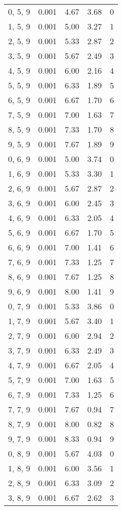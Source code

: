 \documentclass[12pt]{article}
\begin{document}
\begin{tabular}{c || c || c | c | c}
0, 5, 9 & 0.001 & 4.67 & 3.68 & 0 \\
1, 5, 9 & 0.001 & 5.00 & 3.27 & 1 \\
2, 5, 9 & 0.001 & 5.33 & 2.87 & 2 \\
3, 5, 9 & 0.001 & 5.67 & 2.49 & 3 \\
4, 5, 9 & 0.001 & 6.00 & 2.16 & 4 \\
5, 5, 9 & 0.001 & 6.33 & 1.89 & 5 \\
6, 5, 9 & 0.001 & 6.67 & 1.70 & 6 \\
7, 5, 9 & 0.001 & 7.00 & 1.63 & 7 \\
8, 5, 9 & 0.001 & 7.33 & 1.70 & 8 \\
9, 5, 9 & 0.001 & 7.67 & 1.89 & 9 \\
0, 6, 9 & 0.001 & 5.00 & 3.74 & 0 \\
1, 6, 9 & 0.001 & 5.33 & 3.30 & 1 \\
2, 6, 9 & 0.001 & 5.67 & 2.87 & 2 \\
3, 6, 9 & 0.001 & 6.00 & 2.45 & 3 \\
4, 6, 9 & 0.001 & 6.33 & 2.05 & 4 \\
5, 6, 9 & 0.001 & 6.67 & 1.70 & 5 \\
6, 6, 9 & 0.001 & 7.00 & 1.41 & 6 \\
7, 6, 9 & 0.001 & 7.33 & 1.25 & 7 \\
8, 6, 9 & 0.001 & 7.67 & 1.25 & 8 \\
9, 6, 9 & 0.001 & 8.00 & 1.41 & 9 \\
0, 7, 9 & 0.001 & 5.33 & 3.86 & 0 \\
1, 7, 9 & 0.001 & 5.67 & 3.40 & 1 \\
2, 7, 9 & 0.001 & 6.00 & 2.94 & 2 \\
3, 7, 9 & 0.001 & 6.33 & 2.49 & 3 \\
4, 7, 9 & 0.001 & 6.67 & 2.05 & 4 \\
5, 7, 9 & 0.001 & 7.00 & 1.63 & 5 \\
6, 7, 9 & 0.001 & 7.33 & 1.25 & 6 \\
7, 7, 9 & 0.001 & 7.67 & 0.94 & 7 \\
8, 7, 9 & 0.001 & 8.00 & 0.82 & 8 \\
9, 7, 9 & 0.001 & 8.33 & 0.94 & 9 \\
0, 8, 9 & 0.001 & 5.67 & 4.03 & 0 \\
1, 8, 9 & 0.001 & 6.00 & 3.56 & 1 \\
2, 8, 9 & 0.001 & 6.33 & 3.09 & 2 \\
3, 8, 9 & 0.001 & 6.67 & 2.62 & 3 \\

\end{tabular}
\end{document}
